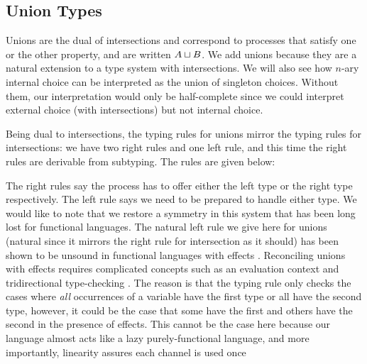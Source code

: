 \documentclass[a4paper,USenglish]{lipics-v2016}
\begin{document}
\subsection{Union Types}

Unions are the dual of intersections and correspond to processes that satisfy one or the other property, and are written $A \mathbin{\sqcup} B$. We add unions because they are a natural extension to a  type system with intersections. We will also see how $n$-ary internal choice can be interpreted as
the union of singleton choices. Without them, our interpretation would only be half-complete since we could interpret external choice (with intersections) but not internal choice.

Being dual to intersections, the typing rules for unions mirror the typing rules for intersections: we have two right rules and one left rule, and this time the right rules are derivable from subtyping. The rules are given below:


The right rules say the process has to offer either the left type or the right type respectively. The left rule says we need to be prepared to handle either type. We would like to note that we restore a symmetry in this system that has been long lost for functional languages. The natural left rule we give here for unions (natural since it mirrors the right rule for intersection as it should) has been shown to be unsound in functional languages with effects . Reconciling unions with effects requires complicated concepts such as an evaluation context and tridirectional type-checking . The reason is that the typing rule only checks the cases where \emph{all} occurrences of a variable have the first type or all have the second type, however, it could be the case that some have the first and others have the second in the presence of effects. This cannot be the case here because our language almost acts like a lazy purely-functional language, and more importantly, linearity assures each channel is used once 
\end{document}
